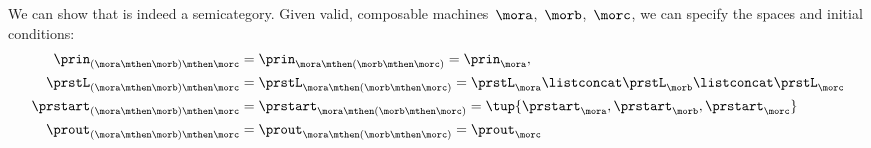     We can show that \Moore is indeed a semicategory.
    Given valid, composable machines~$\mora$,~$\morb$,~$\morc$, we can specify the spaces and initial conditions:
    \begin{equation*}
        \label{eq:moore_assoc_spaces}
        \begin{aligned}
            \prin_{(\mora \mthen \morb)\mthen \morc}    & =\prin_{\mora \mthen (\morb \mthen \morc)}=\prin_{\mora}, \\
            \prstL_{(\mora \mthen \morb)\mthen \morc}   & =\prstL_{\mora \mthen (\morb \mthen \morc)}=  \prstL_{\mora} \listconcat \prstL_{\morb} \listconcat  \prstL_{\morc} \\
            \prstart_{(\mora \mthen \morb)\mthen \morc} & =\prstart_{\mora \mthen (\morb \mthen \morc)}=\tup{\prstart_\mora,\prstart_\morb,\prstart_\morc} \\
            \prout_{(\mora \mthen \morb)\mthen \morc}   & =\prout_{\mora \mthen (\morb \mthen \morc)}=\prout_\morc
        \end{aligned}
    \end{equation*}

